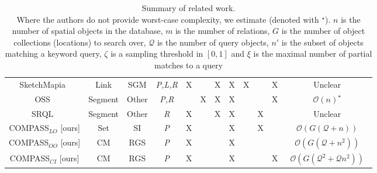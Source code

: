 {\begin{table*}[h!]
\begin{center}
\begin{tabular}{|c|ccc|cccc|ccc|c|}
            SketchMapia~\cite{Schwering2014,Jan2015}            & Link   & SGM   & \textit{P,L,R} & X &   & X & X & X &   & X & Unclear \\                     OSS~\cite{Liu2003}                                  &Segment & Other & \textit{P,R}   &   & X & X & X &   &   & X & $\mathcal{O}(n)^{\star}$ \\             SRQL~\cite{Dellapenna2012,Dellapenna2017}           &Segment & Other & \textit{R}     & X &   & X & X &   & X &   & Unclear \\
            COMPASS$_{LO}$ [ours]                               & Set    &  SI  & \textit{P}     & X &   &   & X &   & X &   & $\mathcal{O}(G(\mathcal{Q} + n))$ \\    
            COMPASS$_{OO}$ [ours]                               & CM     &  RGS  & \textit{P}     & X &   &   & X &   &   &   & $\mathcal{O}(G(\mathcal{Q} + n^2))$ \\  
            COMPASS$_{CI}$ [ours]                               & CM     &  RGS  & \textit{P}     & X &   &   & X &   &   & X & ~$\mathcal{O}(G(\mathcal{Q}^2 + \mathcal{Q} n^2))$~ \\
            
            
            
            \hline     
        \end{tabular}
        \caption{Summary of related work. \\ \textnormal{Where the authors do not provide worst-case complexity, we estimate (denoted with $^{\star}$). $n$ is the number of spatial objects in the database, $m$ is the number of relations, $G$ is the number of object collections (locations) to search over, $\mathcal{Q}$ is the number of query objects, $n'$ is the subset of objects matching a keyword  query, $\zeta$ is a sampling threshold in $[0,1]$ and $\xi$ is the maximal number of partial matches to a query}} 
        \label{Table:related_work}
    \end{center}
\end{table*}
}
\normalsize











